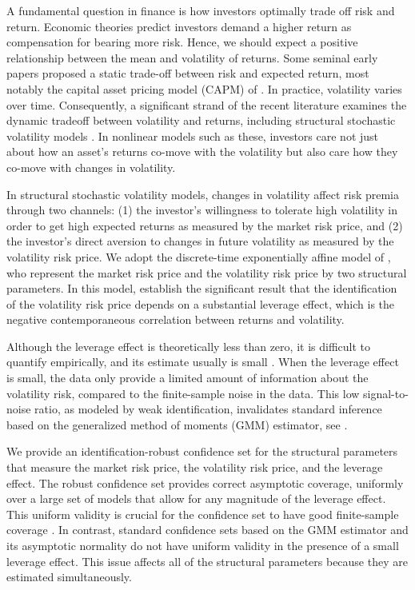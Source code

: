 \documentclass[11pt, letterpaper, twoside]{article}
\begin{document}
A fundamental question in finance is how investors optimally trade off risk and return. Economic theories predict investors demand a higher return as compensation for bearing more risk. Hence, we should expect a positive relationship between the mean and volatility of returns. Some seminal early papers proposed a static trade-off between risk and expected return, most notably the capital asset pricing model (CAPM) of \textcites{sharpe1964capital,lintner1965security}. In practice, volatility varies over time. Consequently, a significant strand of the recent literature examines the dynamic tradeoff between volatility and returns, including structural stochastic volatility models  \parencites{christoffersen2013capturing, bansal2014volatility, dewbecker2017price}.  In nonlinear models such as these, investors care not just about how an asset's returns co-move with the volatility but also care how they co-move with changes in volatility. 

In structural stochastic volatility models, changes in volatility affect risk premia through two channels: (1) the investor's willingness to tolerate high volatility in order to get high expected returns as measured by the market risk price, and (2) the investor’s direct aversion to changes in future volatility as measured by the volatility risk price. We adopt the discrete-time exponentially affine model of \textcite{han2018leverage}, who represent the market risk price and the volatility risk price by two structural parameters. In this model,  \textcite{han2018leverage} establish the significant result that the identification of the volatility risk price depends on a substantial leverage effect, which is the negative contemporaneous correlation between returns and volatility. 

Although the leverage effect is theoretically less than zero, it is difficult to quantify empirically, and its estimate usually is small \parencites{aitsahalia2013leverage}. When the leverage effect is small, the data only provide a limited amount of information about the volatility risk, compared to the finite-sample noise in the data. This low signal-to-noise ratio,  as modeled by weak identification, invalidates standard inference based on the generalized method of moments (GMM) estimator, see \textcites{stock2000GMM,andrews2012estimation}.

We provide an identification-robust confidence set for the structural parameters that measure the market risk price, the volatility risk price, and the leverage effect. 
The robust confidence set provides correct asymptotic coverage, uniformly over a large set of models that allow for any magnitude of the leverage effect. This uniform validity is crucial for the confidence set to have good finite-sample coverage \parencites{mikusheva2007uniform, andrews2010asymptotic}. In contrast, standard confidence sets based on the GMM estimator and its asymptotic normality do not have uniform validity in the presence of a small leverage effect. This issue affects all of the structural parameters because they are estimated simultaneously.
\end{document}
